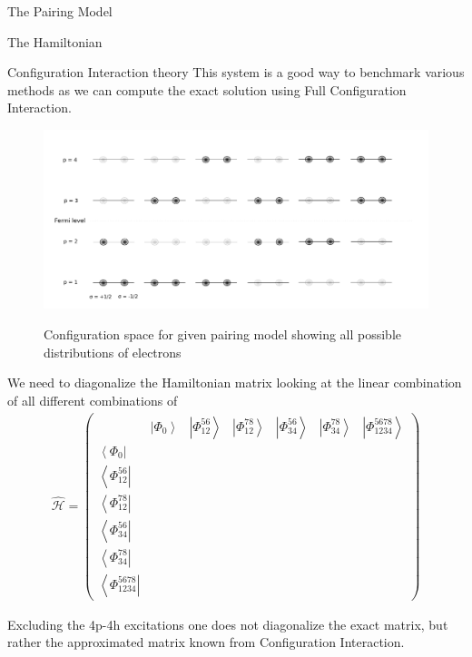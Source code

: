 \documentclass[twoside,english]{uiofysmaster}
\begin{document}
\begin{chapter}{The Pairing Model}
\begin{section}{The Hamiltonian}
	\end{section}

	\newpage

	\begin{section}{Configuration Interaction theory}
		This system is a good way to benchmark various methods as we can compute the exact solution using Full Configuration Interaction. 

		\begin{figure}[H]
			\includegraphics[width=1.1\linewidth]{Figures/Pairing_model2.pdf}
			\label{PairingModel_2}
			\caption{Configuration space for given pairing model showing all possible distributions of electrons}
		\end{figure}

	 	We need to diagonalize the Hamiltonian matrix looking at the linear combination of all different combinations of 
		\begin{align}
			\hat{ \mathcal{H} } = \left(  \begin{matrix}
				& \left| \Phi_0 \right> & \left| \Phi_{12}^{56} \right> & \left| \Phi_{12}^{78} \right> & \left| \Phi_{34}^{56} \right> & \left| \Phi_{34}^{78} \right> & \left| \Phi_{1234}^{5678} \right> \\ 
				\left< \Phi_0 \right| &   &   &   &   &   & \\
				\left< \Phi_{12}^{56} \right| &   &   &   &   &   & \\
				\left< \Phi_{12}^{78} \right| &   &   &   &   &   & \\
				\left< \Phi_{34}^{56} \right| &   &   &   &   &   & \\
				\left< \Phi_{34}^{78} \right| &   &   &   &   &   & \\
				\left< \Phi_{1234}^{5678} \right| &   &   &   &   &   & 
			\end{matrix} \right)
		\end{align}

		Excluding the 4p-4h excitations one does not diagonalize the exact matrix, but rather the approximated matrix known from Configuration Interaction. 


\end{section}
\end{chapter}
\end{document}
